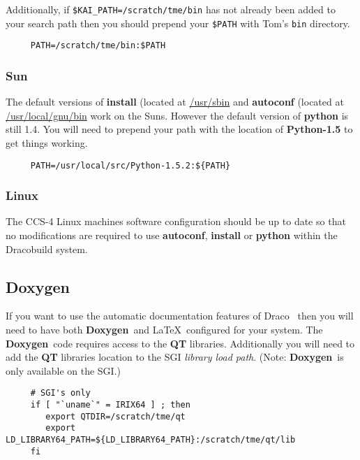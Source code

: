 \documentclass[10pt]{nmemo}
\newcommand{\comp}[1]{\normalfont\normalsize\texttt{#1}}
\newcommand{\draco}{{\normalfont\sffamily Draco}}
\newcommand{\doxygen}{{\normalfont\bfseries Doxygen}}
\begin{document}
Additionally, if \comp{\$KAI\_PATH=/scratch/tme/bin} has not already
been added to your search path then you should prepend your
\comp{\$PATH} with Tom's \comp{bin} directory.

\footnotesize
\begin{verbatim}
     PATH=/scratch/tme/bin:$PATH
\end{verbatim} %
\normalsize

\subsubsection{Sun}

The default versions of \textbf{install} (located at \url{/usr/sbin}
and \textbf{autoconf} (located at \url{/usr/local/gnu/bin} work on
the Suns.  However the default version of \textbf{python} is still
1.4.  You will need to prepend your path with the location of
\textbf{Python-1.5} to get things working.

\footnotesize
\begin{verbatim}
     PATH=/usr/local/src/Python-1.5.2:${PATH}
\end{verbatim} %
\normalsize

\subsubsection{Linux}

The CCS-4 Linux machines software configuration should be up to date
so that no modifications are required to use \textbf{autoconf},
\textbf{install} or \textbf{python} within the \draco build system.

\subsection{Doxygen}
\label{doxygen}

If you want to use the automatic documentation features of
\draco~\cite{doxygen} then you will need to have both \doxygen\ and
\LaTeX\ configured for your system.  The \doxygen\ code requires
access to the \textbf{QT} libraries.  Additionally you will need to
add the \textbf{QT} libraries location to the SGI \emph{library load
  path}. (Note: \doxygen\ is only available on the SGI.)

\footnotesize
\begin{verbatim}
     # SGI's only
     if [ "`uname`" = IRIX64 ] ; then
        export QTDIR=/scratch/tme/qt 
        export LD_LIBRARY64_PATH=${LD_LIBRARY64_PATH}:/scratch/tme/qt/lib
     fi
\end{verbatim} %
\normalsize
\end{document}
